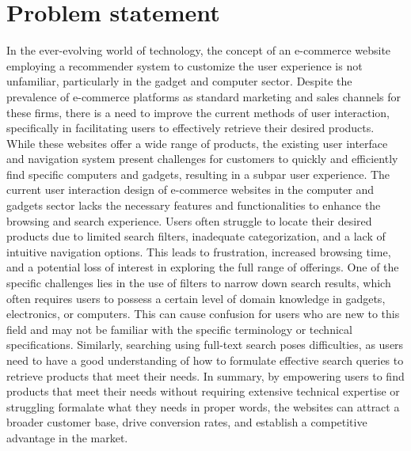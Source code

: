 \section{Problem statement}
In the ever-evolving world of technology, the concept of an e-commerce website employing a recommender system to customize the user experience is not unfamiliar, particularly in the gadget and computer sector. Despite the prevalence of e-commerce platforms as standard marketing and sales channels for these firms, there is a need to improve the current methods of user interaction, specifically in facilitating users to effectively retrieve their desired products. While these websites offer a wide range of products, the existing user interface and navigation system present challenges for customers to quickly and efficiently find specific computers and gadgets, resulting in a subpar user experience.
\newline
\newline
The current user interaction design of e-commerce websites in the computer and gadgets sector lacks the necessary features and functionalities to enhance the browsing and search experience. Users often struggle to locate their desired products due to limited search filters, inadequate categorization, and a lack of intuitive navigation options. This leads to frustration, increased browsing time, and a potential loss of interest in exploring the full range of offerings.
\newline
\newline
One of the specific challenges lies in the use of filters to narrow down search results, which often requires users to possess a certain level of domain knowledge in gadgets, electronics, or computers. This can cause confusion for users who are new to this field and may not be familiar with the specific terminology or technical specifications. Similarly, searching using full-text search poses difficulties, as users need to have a good understanding of how to formulate effective search queries to retrieve products that meet their needs.
\newline
\newline
In summary, by empowering users to find products that meet their needs without requiring extensive technical expertise or struggling formalate what they needs in proper words, the websites can attract a broader customer base, drive conversion rates, and establish a competitive advantage in the market.